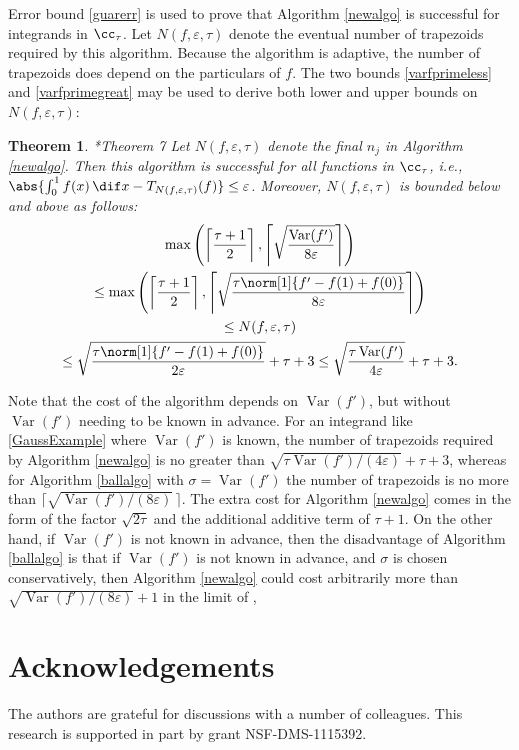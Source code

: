 \documentclass[]{article}
\DeclareMathOperator{\Var}{Var}
\newtheorem{theorem}{Theorem}
\theoremstyle{definition}
\theoremstyle{remark}
\begin{document}
Error bound \eqref{guarerr} is used to prove that Algorithm \ref{newalgo} is successful for integrands in $\cc_{\tau}$.  Let $N(f,\varepsilon,\tau)$ denote the eventual number of trapezoids required by this algorithm.  Because the algorithm is adaptive, the number of trapezoids does depend on the particulars of $f$.  The two bounds \eqref{varfprimeless} and \eqref{varfprimegreat} may be used to derive both lower and upper bounds on $N(f,\varepsilon,\tau)$:

\begin{theorem}\cite{HicEtal14b}*{Theorem 7} \label{conealgothm}
Let $N(f,\varepsilon,\tau)$ denote the final $n_j$ in Algorithm \ref{newalgo}.  Then this algorithm is successful for all functions in $\cc_{\tau}$,  i.e.,  $\abs{\int_0^1 f(x) \, \dif x - T_{N(f,\varepsilon,\tau)}(f)} \le \varepsilon$.  Moreover, $N(f,\varepsilon,\tau)$ is bounded below and above as follows:
\begin{multline}
\max \left(\left \lceil\frac{\tau+1}{2} \right \rceil, \left \lceil \sqrt{\frac{ \Var(f')}{8\varepsilon}} \right \rceil \right) \\
\le \max \left(\left \lceil\frac{\tau+1}{2} \right \rceil, \left \lceil \sqrt{\frac{\tau \norm[1]{f'-f(1)+f(0)}}{8\varepsilon}} \right \rceil \right) \\
\le
N(f,\varepsilon,\tau) \\
\le \sqrt{\frac{\tau \norm[1]{f'-f(1)+f(0)}}{2\varepsilon}} + \tau + 3
\le \sqrt{\frac{\tau \Var(f') }{4\varepsilon}} + \tau + 3.
\end{multline}
\end{theorem}

Note that the cost of the algorithm depends on $\Var(f')$, but without $\Var(f')$ needing to be known in advance. For an integrand like \eqref{GaussExample} where $\Var(f')$ is known, the number of trapezoids required by Algorithm \ref{newalgo} is no greater than  $\sqrt{\tau \Var(f') /(4\varepsilon)} + \tau + 3$, whereas for Algorithm \ref{ballalgo} with $\sigma=\Var(f')$ the number of trapezoids is no more than $\bigl \lceil \sqrt{\Var(f') /(8\varepsilon)} \, \bigr\rceil$.  The extra cost for Algorithm \ref{newalgo} comes in the form of the factor $\sqrt{2\tau}$ and the additional additive term of $\tau+1$.  On the other hand, if $\Var(f')$ is not known in advance, then the disadvantage of Algorithm  \ref{ballalgo} is that if $\Var(f')$ is not known in advance, and $\sigma$ is chosen conservatively, then Algorithm \ref{newalgo} could cost arbitrarily more than $\sqrt{\Var(f') /(8\varepsilon)}+1$ in the limit of , 

\section{Acknowledgements}  The authors are grateful for discussions with a number of colleagues. This research is supported in part by grant NSF-DMS-1115392.


\end{document}
